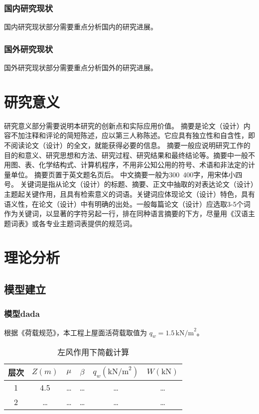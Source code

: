 \documentclass{document}
\begin{document}
\subsubsection{国内研究现状}
国内研究现状部分需要重点分析国内的研究进展。

\subsubsection{国外研究现状}
国外研究现状部分需要重点分析国外的研究进展。

\section{研究意义}
研究意义部分需要说明本研究的创新点和实际应用价值。
摘要是论文（设计）内容不加注释和评论的简短陈述，应以第三人称陈述。它应具有独立性和自含性，即不阅读论文（设计）的全文，就能获得必要的信息。
摘要一般应说明研究工作的目的和意义、研究思想和方法、研究过程、研究结果和最终结论等。摘要中一般不用图、表、化学结构式、计算机程序，不用非公知公用的符号、术语和非法定的计量单位。
摘要页置于英文题名页后。 
中文摘要一般为300~400字，用宋体小四号。 
关键词是指从论文（设计）的标题、摘要、正文中抽取的对表达论文（设计）主题起关键作用，且具有检索意义的词语。关键词应体现论文（设计）特色，具有语义性，在论文（设计）中有明确的出处。一般每篇论文（设计）应选取3-5个词作为关键词，以显著的字符另起一行，排在同种语言摘要的下方，尽量用《汉语主题词表》或各专业主题词表提供的规范词。

\section{理论分析}
\subsection{模型建立}
\subsubsection{模型dada}
根据《荷载规范》，本工程上屋面活荷载取值为 $q_w = 1.5 \, \text{kN/m}^2$。

\begin{table}[htbp]
    \centering
    \caption{左风作用下简截计算}
    \begin{tabular}{cccccc}
      \toprule
      层次 & $Z(m)$ & $\mu$ & $\beta$ & $q_w (\text{kN/m}^2)$ & $W (\text{kN})$ \\
      \midrule
      1 & 4.5 & … & … & … & … \\
      2 & … & … & … & … & … \\
      \bottomrule
    \end{tabular}
  \end{table}
\end{document}
